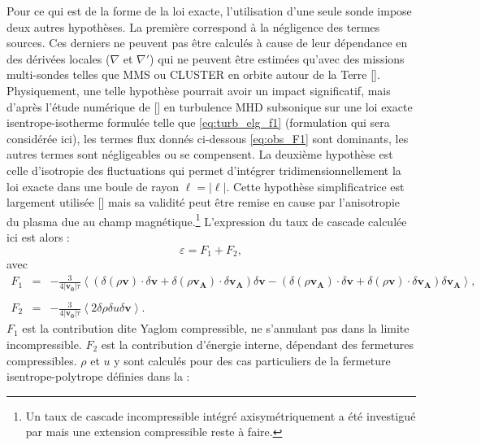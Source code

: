 Pour ce qui est de la forme de la loi exacte, l'utilisation d'une seule sonde impose deux autres hypothèses. La première correspond à la négligence des termes sources. Ces derniers ne peuvent pas être calculés à cause de leur dépendance en des dérivées locales ($\nabla$ et $\nabla'$) qui ne peuvent être estimées qu'avec des missions multi-sondes telles que \ac{MMS} ou \acs{CLUSTER} en orbite autour de la Terre  [\cite{andres_energy_2019}]. Physiquement, une telle hypothèse pourrait avoir un impact significatif, mais d'après l'étude numérique de [\cite{andres_energy_2019}] en turbulence MHD subsonique sur une loi exacte isentrope-isotherme formulée telle que \eqref{eq:turb_elg_f1} (formulation qui sera considérée ici), les termes flux donnés ci-dessous \eqref{eq:obs_F1} sont dominants, les autres termes sont négligeables ou se compensent. La deuxième hypothèse est celle d'isotropie des fluctuations qui permet d'intégrer tridimensionnellement la loi exacte dans une boule de rayon $\ell = |\boldsymbol{\ell}|$. Cette hypothèse simplificatrice est largement utilisée [\cite{parashar_observations_2022}] mais sa validité peut être remise en cause par l'anisotropie du plasma due au champ magnétique.\footnote{Un taux de cascade incompressible intégré axisymétriquement a été investigué par \cite{andres_incompressible_2022} mais une extension compressible reste à faire.} L'expression du taux de cascade calculée ici est alors : 
\begin{equation}
\label{eq:obs}\varepsilon = F_1 + F_2,
\end{equation}
avec
\begin{eqnarray}
\label{eq:obs_F1} F_1 &=& -\frac{3}{4|\boldsymbol{v_0}|\tau}\left<(\delta (\rho\boldsymbol{v}) \cdot \delta \boldsymbol{v}+ \delta (\rho\boldsymbol{v_A}) \cdot \delta \boldsymbol{v_A}) \delta \boldsymbol{v}  -(\delta (\rho\boldsymbol{v_A}) \cdot \delta \boldsymbol{v}  + \delta (\rho\boldsymbol{v}) \cdot \delta \boldsymbol{v_A}  ) \delta \boldsymbol{v_A} \right> \nonumber, \\ &&\\
\label{eq:obs_F2} F_2 &=& -\frac{3}{4|\boldsymbol{v_0}|\tau}\left<2 \delta \rho  \delta u  \delta \boldsymbol{v}\right>.
\end{eqnarray}
$F_1$ est la contribution dite Yaglom compressible, ne s'annulant pas dans la limite incompressible. $F_2$ est la contribution d'énergie interne, dépendant des fermetures compressibles. $\rho$ et $u$ y sont calculés pour des cas particuliers de la fermeture isentrope-polytrope définies dans la  :
